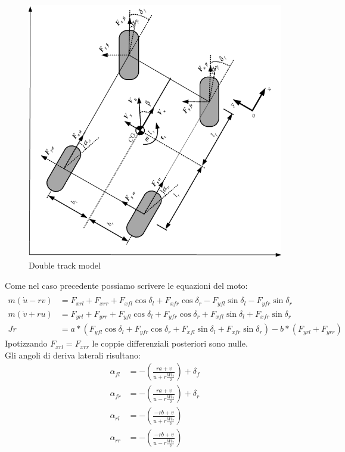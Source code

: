 \begin{figure}[ht]
    \centering
    \includegraphics[scale=0.4]{Immagini/Lateral dynamics/Double-track-model-of-vehicle-lateral-dynamics.png}
    \caption{Double track model}
    \label{fig:Double track model}
\end{figure}
Come nel caso precedente possiamo scrivere le equazioni del moto: 
\begin{align}
\nonumber\\
m(\dot u- rv) & = F_{xrl} + F_{xrr} + F_{xfl} \cos \delta_l + F_{xfr} \cos \delta_r -F_{yfl} \sin \delta_l -F_{yfr} \sin \delta_r\\
m(\dot v+ ru) & = F_{yrl} + F_{yrr} + F_{yfl} \cos \delta_l + F_{yfr} \cos \delta_r +F_{xfl} \sin \delta_l +F_{xfr} \sin \delta_r\\
J\dot r & = a*(F_{yfl} \cos \delta_l + F_{yfr} \cos \delta_r +F_{xfl} \sin \delta_l +F_{xfr} \sin \delta_r)-b*(F_{yrl} + F_{yrr})
\end{align}
Ipotizzando $F_{xrl}=F_{xrr}$ le coppie differenziali posteriori sono nulle.\\
Gli angoli di deriva laterali risultano:\\
\begin{align}
\alpha_{fl} & = - (\frac{ra+v}{u+r\frac{Wt_{f}}{2}}) + \delta_f\\
\alpha_{fr} & = - (\frac{ra+v}{u-r\frac{Wt_{f}}{2}}) + \delta_r\\
\alpha_{rl} & = - (\frac{-rb+v}{u+r\frac{Wt_{r}}{2}})\\
\alpha_{rr} & = - (\frac{-rb+v}{u-r\frac{Wt_{r}}{2}})
\end{align}



